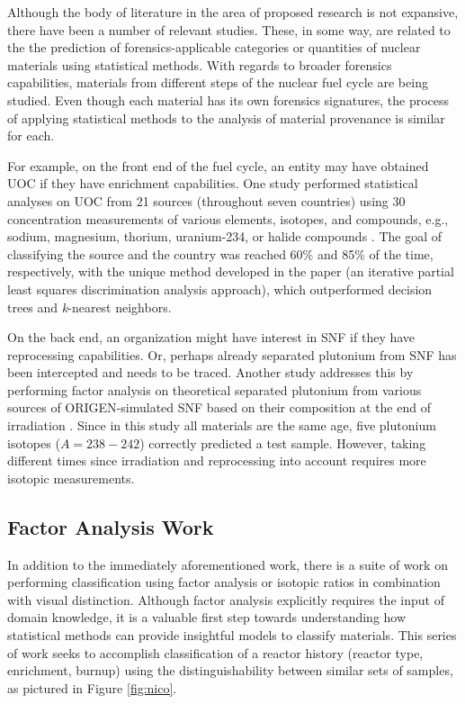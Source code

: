 
Although the body of literature in the area of proposed research is not
expansive, there have been a number of relevant studies. These, in some way,
are related to the the prediction of forensics-applicable categories or
quantities of nuclear materials using statistical methods.  With regards to
broader forensics capabilities, materials from different steps of the nuclear
fuel cycle are being studied.  Even though each material has its own forensics
signatures, the process of applying statistical methods to the analysis of
material provenance is similar for each. 

For example, on the front end of the fuel cycle, an entity may have obtained
\gls{UOC} if they have enrichment capabilities.  One study performed
statistical analyses on \gls{UOC} from 21 sources (throughout seven countries)
using 30 concentration measurements of various elements, isotopes, and
compounds, e.g., sodium, magnesium, thorium, uranium-234, or halide compounds
\cite{robel_2009}.  The goal of classifying the source and the country was
reached 60\% and 85\% of the time, respectively, with the unique method
developed in the paper (an iterative partial least squares discrimination
analysis approach), which outperformed decision trees and \textit{k}-nearest
neighbors.

On the back end, an organization might have interest in \gls{SNF} if they have
reprocessing capabilities.  Or, perhaps already separated plutonium from
\gls{SNF} has been intercepted and needs to be traced. Another study addresses
this by performing factor analysis on theoretical separated plutonium from
various sources of \gls{ORIGEN}-simulated \gls{SNF} based on their composition
at the end of irradiation \cite{nicolaou_pu}.  Since in this study all
materials are the same age, five plutonium isotopes ($A = 238-242$) correctly
predicted a test sample. However, taking different times since irradiation and
reprocessing into account requires more isotopic measurements. 

\subsection{Factor Analysis Work}

In addition to the immediately aforementioned work, there is a suite of work on
performing classification using factor analysis or isotopic ratios in
combination with visual distinction.  Although factor analysis explicitly
requires the input of domain knowledge, it is a valuable first step towards
understanding how statistical methods can provide insightful models to classify
materials.  This series of work seeks to accomplish classification of a reactor
history (reactor type, enrichment, burnup) using the distinguishability between
similar sets of samples, as pictured in Figure \ref{fig:nico}.

